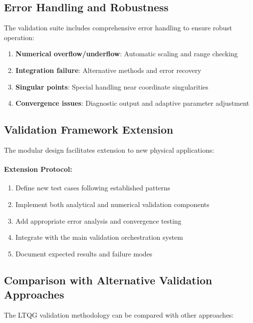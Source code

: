 \subsection{Error Handling and Robustness}
\label{subsec:error_handling}

The validation suite includes comprehensive error handling to ensure robust operation:

\begin{enumerate}
\item \textbf{Numerical overflow/underflow}: Automatic scaling and range checking
\item \textbf{Integration failure}: Alternative methods and error recovery
\item \textbf{Singular points}: Special handling near coordinate singularities
\item \textbf{Convergence issues}: Diagnostic output and adaptive parameter adjustment
\end{enumerate}

\subsection{Validation Framework Extension}
\label{subsec:framework_extension}

The modular design facilitates extension to new physical applications:

\paragraph{Extension Protocol:}
\begin{enumerate}
\item Define new test cases following established patterns
\item Implement both analytical and numerical validation components
\item Add appropriate error analysis and convergence testing
\item Integrate with the main validation orchestration system
\item Document expected results and failure modes
\end{enumerate}

\subsection{Comparison with Alternative Validation Approaches}
\label{subsec:alternative_validation}

The LTQG validation methodology can be compared with other approaches:

